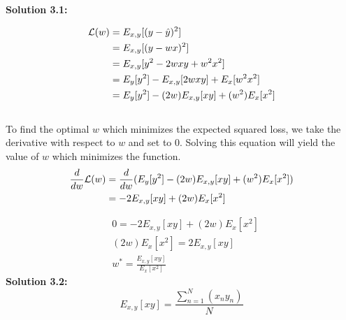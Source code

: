 \documentclass[submit]{harvardml}
\begin{document}
\newpage
\noindent \textbf{Solution 3.1:}

\begin{align*}
    \mathcal{L}(w) &= E_{x,y}[ ( y - \hat{y} )^2] \\ &= E_{x,y}[(y - wx)^2] \\&= E_{x,y}[y^2 - 2wxy +w^2x^2] \\&= E_{y}[y^2] - E_{x,y}[2wxy] + E_{x}[w^2x^2] \\ &= E_{y}[y^2] - (2w)E_{x,y}[xy] + (w^2)E_{x}[x^2]
\end{align*}\\
To find the optimal $w$ which minimizes the expected squared loss, we take the derivative with respect to
$w$ and set to 0. Solving this equation will yield the value of $w$ which minimizes the function.
\\
\begin{align*}
    \frac{d}{dw}\mathcal{L}(w) &= \frac{d}{dw}(E_{y}[y^2] - (2w)E_{x,y}[xy] + (w^2)E_{x}[x^2]) \\ &= -2E_{x,y}[xy] + (2w)E_{x}[x^2]
\end{align*}

\begin{align*}
    &0 = -2E_{x,y}[xy] + (2w)E_{x}[x^2] \\
    &(2w)E_{x}[x^2] = 2E_{x,y}[xy] \\
    &w^* = \frac{E_{x,y}[xy]}{E_{x}[x^2]}
\end{align*}
\textbf{Solution 3.2:}
\[E_{x,y}[xy] = \frac{\sum_{n=1}^N(x_ny_n)}{N}\]
\end{document}
